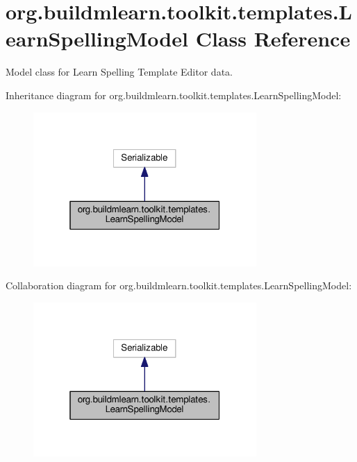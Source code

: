 \hypertarget{classorg_1_1buildmlearn_1_1toolkit_1_1templates_1_1LearnSpellingModel}{}\section{org.\+buildmlearn.\+toolkit.\+templates.\+Learn\+Spelling\+Model Class Reference}
\label{classorg_1_1buildmlearn_1_1toolkit_1_1templates_1_1LearnSpellingModel}


Model class for Learn Spelling Template Editor data.  




Inheritance diagram for org.\+buildmlearn.\+toolkit.\+templates.\+Learn\+Spelling\+Model\+:
\nopagebreak
\begin{figure}[H]
\begin{center}
\leavevmode
\includegraphics[width=241pt]{classorg_1_1buildmlearn_1_1toolkit_1_1templates_1_1LearnSpellingModel__inherit__graph}
\end{center}
\end{figure}


Collaboration diagram for org.\+buildmlearn.\+toolkit.\+templates.\+Learn\+Spelling\+Model\+:
\nopagebreak
\begin{figure}[H]
\begin{center}
\leavevmode
\includegraphics[width=241pt]{classorg_1_1buildmlearn_1_1toolkit_1_1templates_1_1LearnSpellingModel__coll__graph}
\end{center}
\end{figure}
